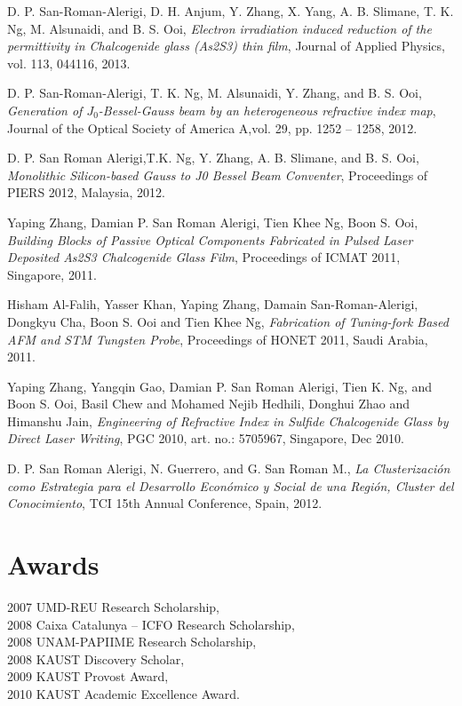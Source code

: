\documentclass[margin]{res}
\begin{document}
D. P. San-Roman-Alerigi, D. H. Anjum, Y. Zhang, X. Yang, A. B. Slimane, T. K. Ng, M. Alsunaidi, and B. S. Ooi, \emph{Electron irradiation induced reduction of the permittivity in Chalcogenide glass (As2S3) thin film}, Journal of Applied Physics, vol. 113, 044116, 2013.

D. P. San-Roman-Alerigi, T. K. Ng, M. Alsunaidi, Y. Zhang, and B. S. Ooi, \emph{Generation of $J_0$-Bessel-Gauss beam by an heterogeneous refractive index map}, Journal of the Optical Society of America A,vol. 29, pp. 1252 -- 1258, 2012.

D. P. San Roman Alerigi,T.K. Ng,  Y. Zhang, A. B. Slimane, and B. S. Ooi, \emph{Monolithic Silicon-based Gauss to J0 Bessel Beam Conventer}, Proceedings of PIERS 2012, Malaysia, 2012.

Yaping Zhang, Damian P. San Roman Alerigi, Tien Khee Ng, Boon S. Ooi, \emph{Building Blocks of Passive Optical Components Fabricated in Pulsed Laser Deposited As2S3 Chalcogenide Glass Film}, Proceedings of ICMAT 2011, Singapore, 2011.

Hisham Al-Falih, Yasser Khan, Yaping Zhang, Damain San-Roman-Alerigi, Dongkyu Cha, Boon S. Ooi and Tien Khee Ng, \emph{Fabrication of Tuning-fork Based AFM and STM Tungsten Probe}, Proceedings of HONET 2011, Saudi Arabia, 2011.

Yaping Zhang, Yangqin Gao, Damian P. San Roman Alerigi, Tien K. Ng, and Boon S. Ooi, Basil Chew and Mohamed Nejib Hedhili, Donghui Zhao and Himanshu Jain, \emph{Engineering of Refractive Index in Sulfide Chalcogenide Glass by Direct Laser Writing}, PGC 2010, art. no.: 5705967, Singapore, Dec 2010.

D. P. San Roman Alerigi, N. Guerrero, and G. San Roman M., \emph{La Clusterización como Estrategia para el
Desarrollo Económico y Social de una Región, Cluster del Conocimiento}, TCI 15th Annual Conference, Spain, 2012.

\section{Awards}
2007 UMD-REU Research Scholarship,\\ 
2008 Caixa Catalunya – ICFO Research Scholarship,\\ 
2008 UNAM-PAPIIME Research Scholarship,\\
2008 KAUST Discovery Scholar,\\
2009 KAUST Provost Award,\\
2010 KAUST Academic Excellence Award.\\
\end{document}
